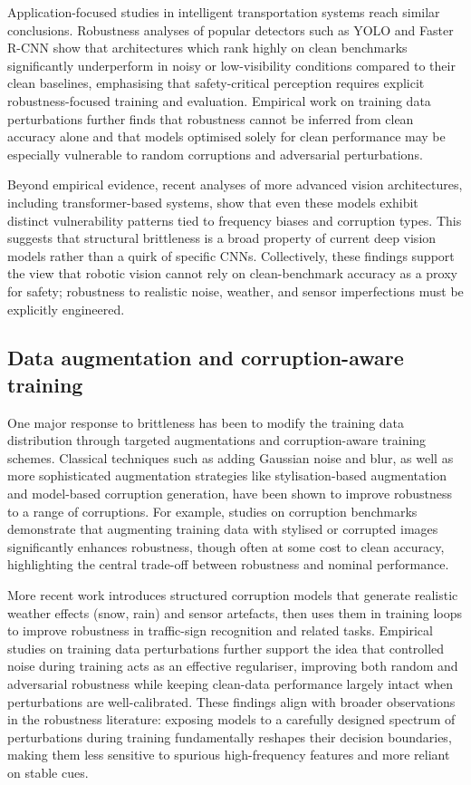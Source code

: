 \documentclass[11pt,a4paper]{article}
\begin{document}
Application-focused studies in intelligent transportation systems reach similar conclusions. Robustness analyses of popular detectors such as YOLO and Faster R-CNN show that architectures which rank highly on clean benchmarks significantly underperform in noisy or low-visibility conditions compared to their clean baselines, emphasising that safety-critical perception requires explicit robustness-focused training and evaluation. Empirical work on training data perturbations further finds that robustness cannot be inferred from clean accuracy alone and that models optimised solely for clean performance may be especially vulnerable to random corruptions and adversarial perturbations.

Beyond empirical evidence, recent analyses of more advanced vision architectures, including transformer-based systems, show that even these models exhibit distinct vulnerability patterns tied to frequency biases and corruption types. This suggests that structural brittleness is a broad property of current deep vision models rather than a quirk of specific CNNs. Collectively, these findings support the view that robotic vision cannot rely on clean-benchmark accuracy as a proxy for safety; robustness to realistic noise, weather, and sensor imperfections must be explicitly engineered.

\subsection{Data augmentation and corruption-aware training}
One major response to brittleness has been to modify the training data distribution through targeted augmentations and corruption-aware training schemes. Classical techniques such as adding Gaussian noise and blur, as well as more sophisticated augmentation strategies like stylisation-based augmentation and model-based corruption generation, have been shown to improve robustness to a range of corruptions. For example, studies on corruption benchmarks demonstrate that augmenting training data with stylised or corrupted images significantly enhances robustness, though often at some cost to clean accuracy, highlighting the central trade-off between robustness and nominal performance.

More recent work introduces structured corruption models that generate realistic weather effects (snow, rain) and sensor artefacts, then uses them in training loops to improve robustness in traffic-sign recognition and related tasks. Empirical studies on training data perturbations further support the idea that controlled noise during training acts as an effective regulariser, improving both random and adversarial robustness while keeping clean-data performance largely intact when perturbations are well-calibrated. These findings align with broader observations in the robustness literature: exposing models to a carefully designed spectrum of perturbations during training fundamentally reshapes their decision boundaries, making them less sensitive to spurious high-frequency features and more reliant on stable cues.
\end{document}
